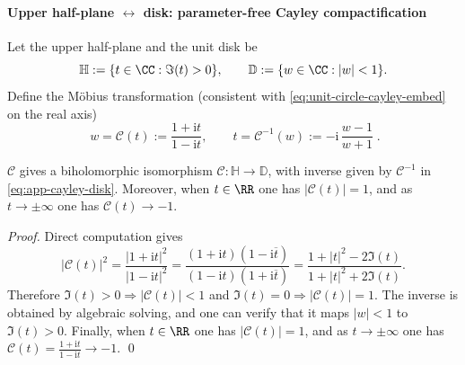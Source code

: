 \paragraph{Upper half-plane \texorpdfstring{$\leftrightarrow$}{<->} disk: parameter-free Cayley compactification}
Let the upper half-plane and the unit disk be
\[
\mathbb{H}:=\{t\in\CC:\Im(t)>0\},
\qquad
\mathbb{D}:=\{w\in\CC:|w|<1\}.
\]
Define the M\"obius transformation (consistent with \eqref{eq:unit-circle-cayley-embed} on the real axis)
\begin{equation}\label{eq:app-cayley-disk}
\boxed{\;
w=\mathcal{C}(t):=\frac{1+\mathrm{i}t}{1-\mathrm{i}t},
\qquad
t=\mathcal{C}^{-1}(w):=-\mathrm{i}\,\frac{w-1}{w+1}\; }.
\end{equation}

\begin{proposition}\label{prop:app-cayley-upperhalf-disk}
\(\mathcal{C}\) gives a biholomorphic isomorphism \(\mathcal{C}:\mathbb{H}\to\mathbb{D}\), with inverse given by \(\mathcal{C}^{-1}\) in \eqref{eq:app-cayley-disk}.
Moreover, when \(t\in\RR\) one has \(|\mathcal{C}(t)|=1\), and as \(t\to\pm\infty\) one has \(\mathcal{C}(t)\to-1\).
\end{proposition}
\begin{proof}
Direct computation gives
\[
|\mathcal{C}(t)|^2
=\frac{|1+\mathrm{i}t|^2}{|1-\mathrm{i}t|^2}
=\frac{(1+\mathrm{i}t)(1-\mathrm{i}\overline t)}{(1-\mathrm{i}t)(1+\mathrm{i}\overline t)}
=\frac{1+|t|^2-2\Im(t)}{1+|t|^2+2\Im(t)}.
\]
Therefore \(\Im(t)>0\Rightarrow |\mathcal{C}(t)|<1\) and \(\Im(t)=0\Rightarrow |\mathcal{C}(t)|=1\).
The inverse is obtained by algebraic solving, and one can verify that it maps \(|w|<1\) to \(\Im(t)>0\).
Finally, when \(t\in\RR\) one has \(|\mathcal{C}(t)|=1\), and as \(t\to\pm\infty\) one has \(\mathcal{C}(t)=\frac{1+\mathrm{i}t}{1-\mathrm{i}t}\to-1\). \qed
\end{proof}

